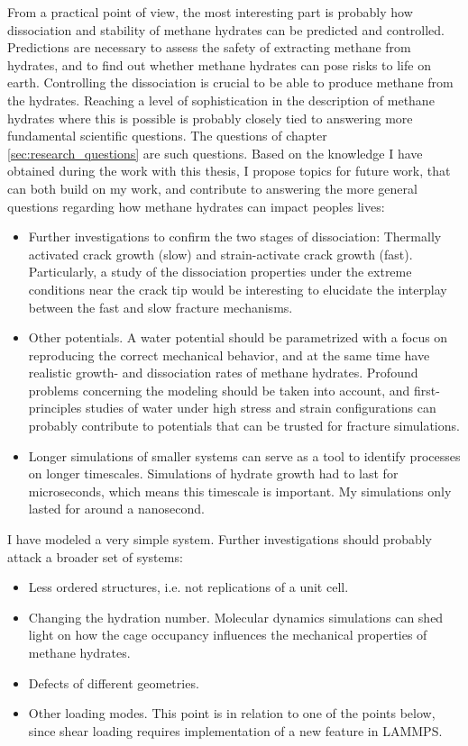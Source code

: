 From a practical point of view, the most interesting part is probably how dissociation and stability of methane hydrates can be predicted and controlled. Predictions are necessary to assess the safety of extracting methane from hydrates, and to find out whether methane hydrates can pose risks to life on earth. Controlling the dissociation is crucial to be able to produce methane from the hydrates. Reaching a level of sophistication in the description of methane hydrates where this is possible is probably closely tied to answering more fundamental scientific questions. The questions of chapter \ref{sec:research_questions} are such questions. Based on the knowledge I have obtained during the work with this thesis, I propose topics for future work, that can both build on my work, and contribute to answering the more general questions regarding how methane hydrates can impact peoples lives:


\begin{itemize}
\item Further investigations to confirm the two stages of dissociation: Thermally activated crack growth (slow) and strain-activate crack growth (fast). Particularly, a study of the dissociation properties under the extreme conditions near the crack tip would be interesting to elucidate the interplay between the fast and slow fracture mechanisms.
\item Other potentials. A water potential should be parametrized with a focus on reproducing the correct mechanical behavior, and at the same time have realistic growth- and dissociation rates of methane hydrates. Profound problems concerning the modeling should be taken into account, and first-principles studies of water under high stress and strain configurations can probably contribute to potentials that can be trusted for fracture simulations. 
\item Longer simulations of smaller systems can serve as a tool to identify processes on longer timescales. Simulations of hydrate growth had to last for microseconds, which means this timescale is important. My simulations only lasted for around a nanosecond.
\end{itemize}

I have modeled a very simple system. Further investigations should probably attack a broader set of systems:

\begin{itemize}
\item Less ordered structures, i.e. not replications of a unit cell.
\item Changing the hydration number. Molecular dynamics simulations can shed light on how the cage occupancy influences the mechanical properties of methane hydrates.
\item Defects of different geometries.
\item Other loading modes. This point is in relation to one of the points below, since shear loading requires implementation of a new feature in LAMMPS.
\end{itemize}
%

